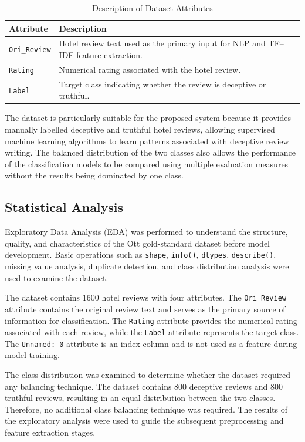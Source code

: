 \documentclass[12pt,a4paper]{report}
\begin{document}
\begin{table}[H]
\centering
\small
\renewcommand{\arraystretch}{1.3}
\begin{tabularx}{0.95\textwidth}{|p{}|X|}
\hline
\textbf{Attribute} & \textbf{Description} \\
\hline
\texttt{Ori\_Review} & Hotel review text used as the primary input for NLP and TF--IDF feature extraction. \\
\hline
\texttt{Rating} & Numerical rating associated with the hotel review. \\
\hline
\texttt{Label} & Target class indicating whether the review is deceptive or truthful. \\
\hline
\end{tabularx}
\caption{Description of Dataset Attributes}
\label{tab:datasetattributes}
\end{table}

The dataset is particularly suitable for the proposed system because it provides manually labelled deceptive and truthful hotel reviews, allowing supervised machine learning algorithms to learn patterns associated with deceptive review writing. The balanced distribution of the two classes also allows the performance of the classification models to be compared using multiple evaluation measures without the results being dominated by one class.

\subsection{Statistical Analysis}

Exploratory Data Analysis (EDA) was performed to understand the structure, quality, and characteristics of the Ott gold-standard dataset before model development. Basic operations such as \texttt{shape}, \texttt{info()}, \texttt{dtypes}, \texttt{describe()}, missing value analysis, duplicate detection, and class distribution analysis were used to examine the dataset.

The dataset contains 1600 hotel reviews with four attributes. The \texttt{Ori\_Review} attribute contains the original review text and serves as the primary source of information for classification. The \texttt{Rating} attribute provides the numerical rating associated with each review, while the \texttt{Label} attribute represents the target class. The \texttt{Unnamed: 0} attribute is an index column and is not used as a feature during model training.

The class distribution was examined to determine whether the dataset required any balancing technique. The dataset contains 800 deceptive reviews and 800 truthful reviews, resulting in an equal distribution between the two classes. Therefore, no additional class balancing technique was required. The results of the exploratory analysis were used to guide the subsequent preprocessing and feature extraction stages.
\end{document}
